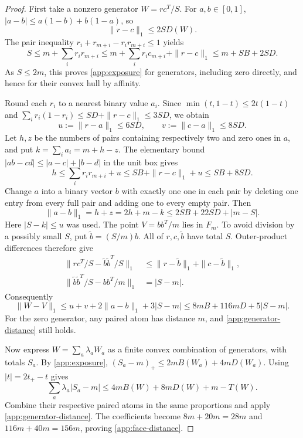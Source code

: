 \begin{proof}
First take a nonzero generator $W=rc^T/S$. For $a,b\in[0,1]$,
$|a-b|\le a(1-b)+b(1-a)$, so
\begin{equation}
 \|r-c\|_1\le2SD(W).\label{app:margin-distance}
\end{equation}
The pair inequality $r_i+r_{m+i}-r_ir_{m+i}\le1$ yields
\[
 S\le m+\sum_i r_ir_{m+i}
 \le m+\sum_i r_ic_{m+i}+\|r-c\|_1
 \le m+SB+2SD.
\]
As $S\le2m$, this proves \eqref{app:exposure} for generators,
including zero directly, and hence for their convex hull by affinity.

Round each $r_i$ to a nearest binary value $a_i$. Since
$\min(t,1-t)\le2t(1-t)$ and
$\sum_i r_i(1-r_i)\le SD+\|r-c\|_1\le3SD$, we obtain
\[
 u:=\|r-a\|_1\le6SD,\qquad v:=\|c-a\|_1\le8SD.
\]
Let $h,z$ be the numbers of pairs containing respectively two and zero
ones in $a$, and put $k=\sum_i a_i=m+h-z$. The elementary bound
$|ab-cd|\le|a-c|+|b-d|$ in the unit box gives
\[
 h\le\sum_i r_ir_{m+i}+u
 \le SB+\|r-c\|_1+u\le SB+8SD.
\]
Change $a$ into a binary vector $b$ with exactly one one in each pair
by deleting one entry from every full pair and adding one to every
empty pair. Then
\[
 \|a-b\|_1=h+z=2h+m-k
 \le2SB+22SD+|m-S|.
\]
Here $|S-k|\le u$ was used. The point $V=bb^T/m$ lies in $F_m$.
To avoid division by a possibly small $S$, put $\widetilde b=(S/m)b$.
All of $r,c,\widetilde b$ have total $S$. Outer-product differences
therefore give
\begin{align*}
 \|rc^T/S-\widetilde b\widetilde b^T/S\|_1
 &\le\|r-\widetilde b\|_1+\|c-\widetilde b\|_1,\\
 \|\widetilde b\widetilde b^T/S-bb^T/m\|_1&=|S-m|.
\end{align*}
Consequently
\begin{equation}
 \|W-V\|_1\le u+v+2\|a-b\|_1+3|S-m|
 \le8mB+116mD+5|S-m|.\label{app:generator-distance}
\end{equation}
For the zero generator, any paired atom has distance $m$, and
\eqref{app:generator-distance} still holds.

Now express $W=\sum_a\lambda_aW_a$ as a finite convex combination
of generators, with totals $S_a$. By \eqref{app:exposure},
$(S_a-m)_+\le2mB(W_a)+4mD(W_a)$. Using
$|t|=2t_+-t$ gives
\[
 \sum_a\lambda_a|S_a-m|
 \le4mB(W)+8mD(W)+m-T(W).
\]
Combine their respective paired atoms in the same proportions and apply
\eqref{app:generator-distance}. The coefficients become
$8m+20m=28m$ and $116m+40m=156m$, proving
\eqref{app:face-distance}.
\end{proof}


